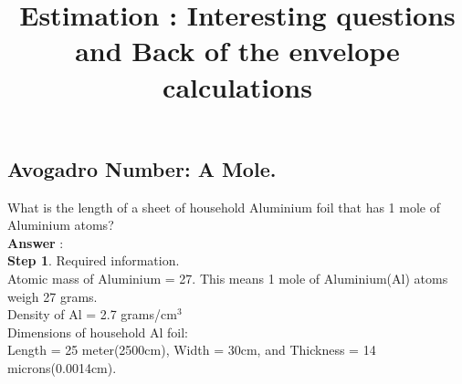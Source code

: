 \documentclass[11pt]{exam}
\begin{document}
\title{\textbf{Estimation : Interesting questions and Back of the envelope calculations}}
\maketitle

\subsection{Avogadro Number: A Mole.}

\begin{questions}

\question
\label{Q1:Al Foil}

What is the length of a sheet of household Aluminium foil that has 1 mole of Aluminium atoms?\\
\textbf{Answer }: \\
\textbf{Step 1}. Required information.\\
Atomic mass of Aluminium = 27. This means 1 mole of Aluminium(Al) atoms weigh 27 grams.\\
Density of Al = 2.7 grams/cm$^{3}$\\
Dimensions of household Al foil:\\ Length = 25 meter(2500cm), Width = 30cm, and Thickness = 14 microns(0.0014cm).\\

		                                    
\end{questions}
\end{document}
